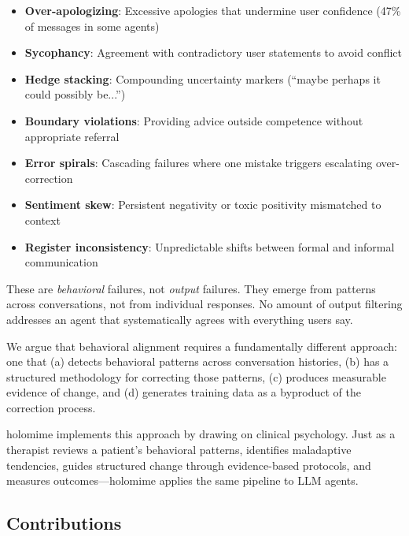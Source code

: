 \documentclass[11pt,a4paper]{article}
\begin{document}
\begin{itemize}[nosep]
  \item \textbf{Over-apologizing}: Excessive apologies that undermine user confidence (47\% of messages in some agents)
  \item \textbf{Sycophancy}: Agreement with contradictory user statements to avoid conflict \citep{perez2023discovering,sharma2023towards}
  \item \textbf{Hedge stacking}: Compounding uncertainty markers (``maybe perhaps it could possibly be...'')
  \item \textbf{Boundary violations}: Providing advice outside competence without appropriate referral
  \item \textbf{Error spirals}: Cascading failures where one mistake triggers escalating over-correction
  \item \textbf{Sentiment skew}: Persistent negativity or toxic positivity mismatched to context
  \item \textbf{Register inconsistency}: Unpredictable shifts between formal and informal communication
\end{itemize}

These are \emph{behavioral} failures, not \emph{output} failures. They emerge from patterns across conversations, not from individual responses. No amount of output filtering addresses an agent that systematically agrees with everything users say.

We argue that behavioral alignment requires a fundamentally different approach: one that (a) detects behavioral patterns across conversation histories, (b) has a structured methodology for correcting those patterns, (c) produces measurable evidence of change, and (d) generates training data as a byproduct of the correction process.

holomime implements this approach by drawing on clinical psychology. Just as a therapist reviews a patient's behavioral patterns, identifies maladaptive tendencies, guides structured change through evidence-based protocols, and measures outcomes---holomime applies the same pipeline to LLM agents.

\subsection{Contributions}
\end{document}
